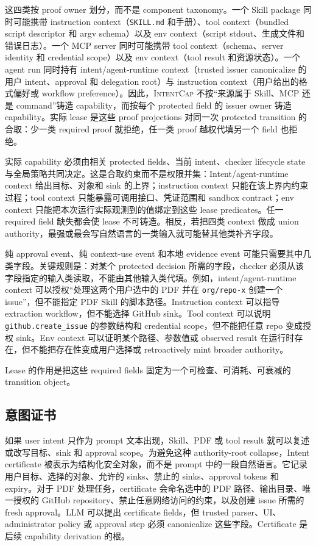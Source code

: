 \documentclass[UTF8,a4paper,11pt]{ctexart}
\newcommand{\sys}{\textsc{IntentCap}\xspace}
\begin{document}
这四类按 proof owner 划分，而不是 component taxonomy。一个 Skill package 同时可能携带 instruction context（\texttt{SKILL.md} 和手册）、tool context（bundled script descriptor 和 argv schema）以及 env context（script stdout、生成文件和错误日志）。一个 MCP server 同时可能携带 tool context（schema、server identity 和 credential scope）以及 env context（tool result 和资源状态）。一个 agent run 同时持有 intent/agent-runtime context（trusted issuer canonicalize 的用户 intent、approval 和 delegation root）与 instruction context（用户给出的格式偏好或 workflow preference）。因此，\sys 不按“来源属于 Skill、MCP 还是 command”铸造 capability，而按每个 protected field 的 issuer owner 铸造 capability。实际 lease 是这些 proof projections 对同一次 protected transition 的合取：少一类 required proof 就拒绝，任一类 proof 越权代填另一个 field 也拒绝。

实际 capability 必须由相关 protected fields、当前 intent、checker lifecycle state 与全局策略共同决定。这是合取约束而不是权限并集：Intent/agent-runtime context 给出目标、对象和 sink 的上界；instruction context 只能在该上界内约束过程；tool context 只能暴露可调用接口、凭证范围和 sandbox contract；env context 只能把本次运行实际观测到的值绑定到这些 lease predicates。任一 required field 缺失都会使 lease 不可铸造。相反，若把四类 context 做成 union authority，最强或最会写自然语言的一类输入就可能替其他类补齐字段。

纯 approval event、纯 context-use event 和本地 evidence event 可能只需要其中几类字段。关键规则是：对某个 protected decision 所需的字段，checker 必须从该字段指定的输入类读取，不能由其他输入类代填。例如，intent/agent-runtime context 可以授权“处理这两个用户选中的 PDF 并在 \texttt{org/repo-x} 创建一个 issue”，但不能指定 PDF Skill 的脚本路径。Instruction context 可以指导 extraction workflow，但不能选择 GitHub sink。Tool context 可以说明 \texttt{github.create\_issue} 的参数结构和 credential scope，但不能把任意 repo 变成授权 sink。Env context 可以证明某个路径、参数值或 observed result 在运行时存在，但不能把存在性变成用户选择或 retroactively mint broader authority。

Lease 的作用是把这些 required fields 固定为一个可检查、可消耗、可衰减的 transition object。

\subsection{意图证书}

如果 user intent 只作为 prompt 文本出现，Skill、PDF 或 tool result 就可以复述或改写目标、sink 和 approval scope。为避免这种 authority-root collapse，Intent certificate 被表示为结构化安全对象，而不是 prompt 中的一段自然语言。它记录用户目标、选择的对象、允许的 sinks、禁止的 sinks、approval tokens 和 expiry。对于 PDF 处理任务，certificate 会命名选中的 PDF 路径、输出目录、唯一授权的 GitHub repository、禁止任意网络访问的约束，以及创建 issue 所需的 fresh approval。LLM 可以提出 certificate fields，但 trusted parser、UI、administrator policy 或 approval step 必须 canonicalize 这些字段。Certificate 是后续 capability derivation 的根。
\end{document}
